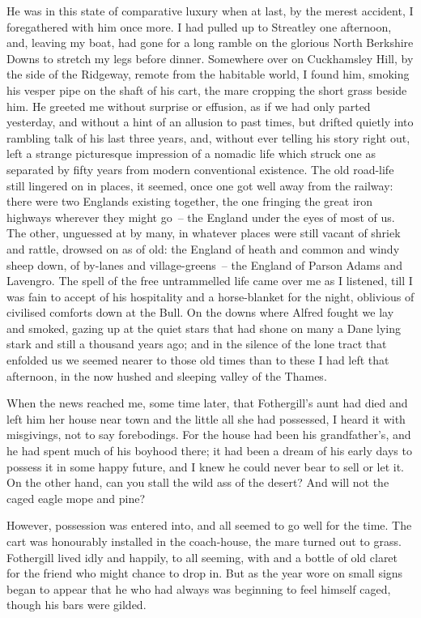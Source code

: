 He was in this state of comparative luxury when at last, by the merest
accident, I foregathered with him once more. I had pulled up to
Streatley one afternoon, and, leaving my boat, had gone for a long
ramble on the glorious North Berkshire Downs to stretch my legs before
dinner. Somewhere over on Cuckhamsley Hill, by the side of the
Ridgeway, remote from the habitable world, I found him, smoking his
vesper pipe on the shaft of his cart, the mare cropping the short
grass beside him. He greeted me without surprise or effusion, as if
we had only parted yesterday, and without a hint of an allusion to
past times, but drifted quietly into rambling talk of his last three
years, and, without ever telling his story right out, left a strange
picturesque impression of a nomadic life which struck one as separated
by fifty years from modern conventional existence. The old road-life
still lingered on in places, it seemed, once one got well away from
the railway: there were two Englands existing together, the one
fringing the great iron highways wherever they might go~-- the England
under the eyes of most of us. The other, unguessed at by many, in
whatever places were still vacant of shriek and rattle, drowsed on as
of old: the England of heath and common and windy sheep down, of
by-lanes and village-greens~-- the England of Parson Adams and
Lavengro. The spell of the free untrammelled life came over me as I
listened, till I was fain to accept of his hospitality and a
horse-blanket for the night, oblivious of civilised comforts down at
the Bull. On the downs where Alfred fought we lay and smoked, gazing
up at the quiet stars that had shone on many a Dane lying stark and
still a thousand years ago; and in the silence of the lone tract that
enfolded us we seemed nearer to those old times than to these I had
left that afternoon, in the now hushed and sleeping valley of the
Thames.

When the news reached me, some time later, that Fother\-gill's aunt had
died and left him her house near town and the little all she had
possessed, I heard it with misgivings, not to say forebodings. For
the house had been his grandfather's, and he had spent much of his
boyhood there; it had been a dream of his early days to possess it in
some happy future, and I knew he could never bear to sell or let
it. On the other hand, can you stall the wild ass of the desert? And
will not the caged eagle mope and pine?

However, possession was entered into, and all seemed to go well for
the time. The cart was honourably installed in the coach-house, the
mare turned out to grass. Fothergill lived idly and happily, to all
seeming, with  and a
bottle of old claret for the friend who might chance to drop in. But
as the year wore on small signs began to appear that he who had always
 was beginning
to feel himself caged, though his bars were gilded.

